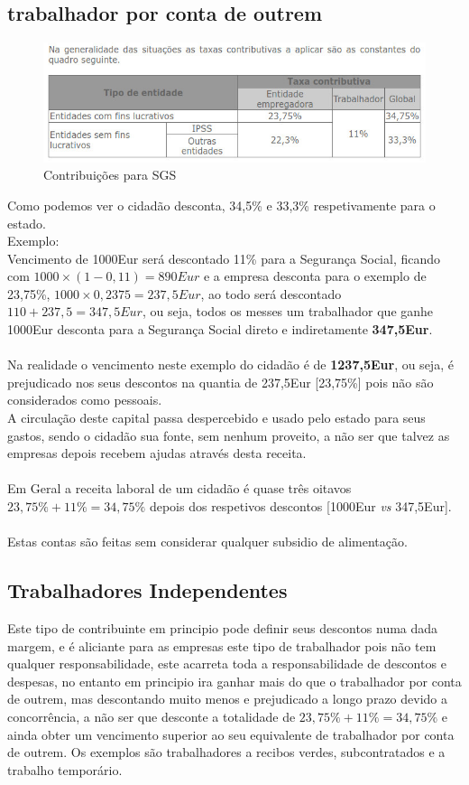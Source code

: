 \subsection{trabalhador por conta de outrem}
\begin{figure}[H]
\flushleft
\includegraphics[scale=.5]{./image/SGS/Contribuicoes_1.jpg}
\caption{Contribuições para SGS}
\end{figure}\par
\qquad Como podemos ver o cidadão desconta, 34,5\% e 33,3\% respetivamente para o estado.\\
Exemplo:\\ 
Vencimento de 1000Eur será descontado 11\% para a Segurança Social, ficando com $1000\times (1-0,11)=890Eur$ e a empresa desconta para o exemplo de 23,75\%, $1000\times 0,2375=237,5Eur$, ao todo será descontado $110+237,5=347,5Eur$, ou seja, todos os messes um trabalhador que ganhe 1000Eur desconta para a Segurança Social direto e indiretamente \textbf{347,5Eur}.\\ \\
Na realidade o vencimento neste exemplo do cidadão é de \textbf{1237,5Eur}, ou seja, é prejudicado nos seus descontos na quantia de 237,5Eur [23,75\%] pois não são considerados como pessoais.\\
A circulação deste capital passa despercebido e usado pelo estado para seus gastos, sendo o cidadão sua fonte, sem nenhum proveito, a não ser que talvez as empresas depois recebem ajudas através desta receita.\\ \\
Em Geral a receita laboral de um cidadão é quase três oitavos $23,75\%+11\%=34,75\%$ depois dos respetivos descontos [1000Eur \textit{vs} 347,5Eur].\\
\\
Estas contas são feitas sem considerar qualquer subsidio de alimentação.
\subsection{Trabalhadores Independentes}
\qquad Este tipo de contribuinte em principio pode definir seus descontos numa dada margem, e é aliciante para as empresas este tipo de trabalhador pois não tem qualquer responsabilidade, este acarreta toda a responsabilidade de descontos e despesas, no entanto em principio ira ganhar mais do que o trabalhador por conta de outrem, mas descontando muito menos e prejudicado a longo prazo devido a concorrência, a não ser que desconte a totalidade de $23,75\%+11\%=34,75\%$ e ainda obter um vencimento superior ao seu equivalente de trabalhador por conta de outrem.
Os exemplos são trabalhadores a recibos verdes, subcontratados e a trabalho temporário.
